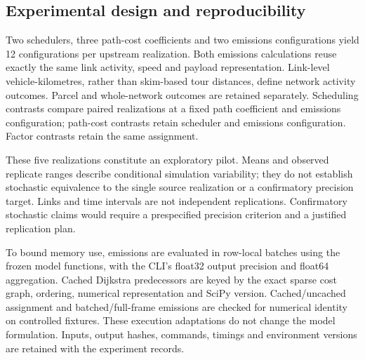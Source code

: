 \subsection{Experimental design and reproducibility}
Two schedulers, three path-cost coefficients and two emissions configurations
yield 12 configurations per upstream realization. Both emissions calculations
reuse exactly the same link activity, speed and payload representation.
Link-level vehicle-kilometres, rather than skim-based tour distances, define
network activity outcomes. Parcel and whole-network outcomes are retained
separately. Scheduling contrasts compare paired realizations at a fixed path
coefficient and emissions configuration; path-cost contrasts retain scheduler
and emissions configuration. Factor contrasts retain the same assignment.

These five realizations constitute an exploratory pilot. Means and observed
replicate ranges describe conditional simulation variability; they do not
establish stochastic equivalence to the single source realization or a
confirmatory precision target. Links and time intervals are not independent
replications. Confirmatory stochastic claims would require a prespecified precision
criterion and a justified replication plan.

To bound memory use, emissions are evaluated in row-local batches using the
frozen model functions, with the CLI's float32 output precision and float64
aggregation. Cached Dijkstra predecessors are keyed by the exact sparse cost
graph, ordering, numerical representation and SciPy version. Cached/uncached
assignment and batched/full-frame emissions are checked for numerical identity
on controlled fixtures. These execution adaptations do not change the model
formulation. Inputs, output hashes, commands, timings and environment versions
are retained with the experiment records.
